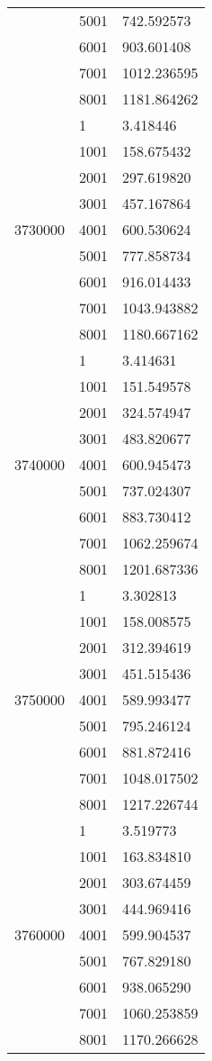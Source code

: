 \begin{table}[htb!]
\begin{tabular}{lll}
 & 5001 & 742.592573 \\
 & 6001 & 903.601408 \\
 & 7001 & 1012.236595 \\
 & 8001 & 1181.864262 \\
\multirow[c]{9}{*}{3730000} & 1 & 3.418446 \\
 & 1001 & 158.675432 \\
 & 2001 & 297.619820 \\
 & 3001 & 457.167864 \\
 & 4001 & 600.530624 \\
 & 5001 & 777.858734 \\
 & 6001 & 916.014433 \\
 & 7001 & 1043.943882 \\
 & 8001 & 1180.667162 \\
\multirow[c]{9}{*}{3740000} & 1 & 3.414631 \\
 & 1001 & 151.549578 \\
 & 2001 & 324.574947 \\
 & 3001 & 483.820677 \\
 & 4001 & 600.945473 \\
 & 5001 & 737.024307 \\
 & 6001 & 883.730412 \\
 & 7001 & 1062.259674 \\
 & 8001 & 1201.687336 \\
\multirow[c]{9}{*}{3750000} & 1 & 3.302813 \\
 & 1001 & 158.008575 \\
 & 2001 & 312.394619 \\
 & 3001 & 451.515436 \\
 & 4001 & 589.993477 \\
 & 5001 & 795.246124 \\
 & 6001 & 881.872416 \\
 & 7001 & 1048.017502 \\
 & 8001 & 1217.226744 \\
\multirow[c]{9}{*}{3760000} & 1 & 3.519773 \\
 & 1001 & 163.834810 \\
 & 2001 & 303.674459 \\
 & 3001 & 444.969416 \\
 & 4001 & 599.904537 \\
 & 5001 & 767.829180 \\
 & 6001 & 938.065290 \\
 & 7001 & 1060.253859 \\
 & 8001 & 1170.266628 \\

\end{tabular}
\end{table}
